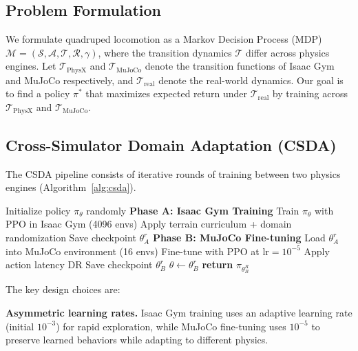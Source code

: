 \documentclass[conference]{IEEEtran}
\begin{document}
\subsection{Problem Formulation}

We formulate quadruped locomotion as a Markov Decision Process (MDP) $\mathcal{M} = (\mathcal{S}, \mathcal{A}, \mathcal{T}, \mathcal{R}, \gamma)$, where the transition dynamics $\mathcal{T}$ differ across physics engines. Let $\mathcal{T}_{\text{PhysX}}$ and $\mathcal{T}_{\text{MuJoCo}}$ denote the transition functions of Isaac Gym and MuJoCo respectively, and $\mathcal{T}_{\text{real}}$ denote the real-world dynamics. Our goal is to find a policy $\pi^*$ that maximizes expected return under $\mathcal{T}_{\text{real}}$ by training across $\mathcal{T}_{\text{PhysX}}$ and $\mathcal{T}_{\text{MuJoCo}}$.

\subsection{Cross-Simulator Domain Adaptation (CSDA)}

The CSDA pipeline consists of iterative rounds of training between two physics engines (Algorithm~\ref{alg:csda}).

\begin{algorithm}[t]
\caption{Cross-Simulator Domain Adaptation}
\label{alg:csda}
\begin{algorithmic}[1]
\STATE Initialize policy $\pi_\theta$ randomly
    \STATE \textbf{Phase A: Isaac Gym Training}
    \STATE Train $\pi_\theta$ with PPO in Isaac Gym (4096 envs)
    \STATE Apply terrain curriculum + domain randomization
    \STATE Save checkpoint $\theta_A^r$
    \STATE \textbf{Phase B: MuJoCo Fine-tuning}
    \STATE Load $\theta_A^r$ into MuJoCo environment (16 envs)
    \STATE Fine-tune with PPO at $\text{lr} = 10^{-5}$
    \STATE Apply action latency DR
    \STATE Save checkpoint $\theta_B^r$
    \STATE $\theta \leftarrow \theta_B^r$ 
\ENDFOR
\STATE \textbf{return} $\pi_{\theta_B^R}$
\end{algorithmic}
\end{algorithm}

The key design choices are:

\textbf{Asymmetric learning rates.} Isaac Gym training uses an adaptive learning rate (initial $10^{-3}$) for rapid exploration, while MuJoCo fine-tuning uses $10^{-5}$ to preserve learned behaviors while adapting to different physics.
\end{document}

